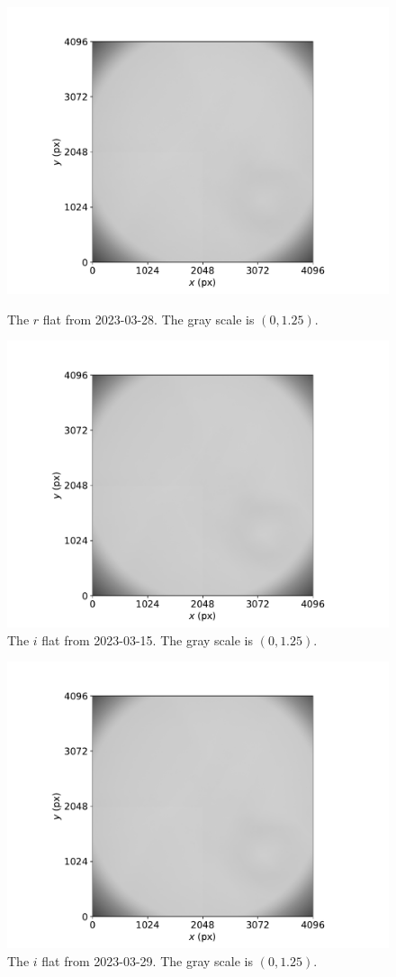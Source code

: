 \documentclass{article}
\begin{document}
\begin{figure}[pb]
\begin{center}
\includegraphics[width=0.7\columnwidth]{figures/flat-r-20230328.pdf}
\medskip
\caption{The $r$ flat from 2023-03-28. The gray scale is $(0,1.25)$.}
\label{figure:flat-r-20230328}
\label{figure:flat-first}
\end{center}
\end{figure}

\begin{figure}[pb]
\begin{center}
\includegraphics[width=0.7\columnwidth]{figures/flat-i-20230315.pdf}
\medskip
\caption{The $i$ flat from 2023-03-15. The gray scale is $(0,1.25)$.}
\label{figure:flat-i-20230315}
\end{center}
\end{figure}

\begin{figure}[pb]
\begin{center}
\includegraphics[width=0.7\columnwidth]{figures/flat-i-20230329.pdf}
\medskip
\caption{The $i$ flat from 2023-03-29. The gray scale is $(0,1.25)$.}
\label{figure:flat-i-20230329}
\end{center}
\end{figure}
\end{document}
